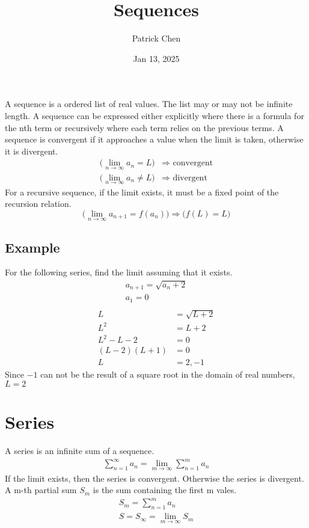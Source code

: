 \documentclass{article}
\title{Sequences}
\author{Patrick Chen}
\date{Jan 13, 2025}
\theoremstyle{mytheoremstyle}
\theoremstyle{mytheoremstyle}
\theoremstyle{myproblemstyle}
\begin{document}
    \maketitle
    A sequence is a ordered list of real values. The list may or may not be
    infinite length. A sequence can be expressed either explicitly where there
    is a formula for the nth term or recursively where each term relies on the
    previous terms. A sequence is convergent if it approaches a value when the
    limit is taken, otherwise it is
    divergent.
    \begin{align*}
        \Big(\lim_{n\rightarrow\infty} a_n = L\Big) &\Rightarrow \text{ convergent} \\
        \Big(\lim_{n\rightarrow\infty} a_n \ne L\Big) &\Rightarrow \text{ divergent}
    \end{align*}
    For a recursive sequence, if the limit exists, it must be a fixed point of
    the recursion relation.
    \[
        \Big(\lim_{n\to \infty} a_{n+1}=f(a_n)\Big) \Rightarrow \Big(f(L)=L\Big)
    \]

    \subsection*{Example}
    For the following series, find the limit assuming that it exists.
    \begin{align*}
        a_{n+1} = \sqrt{a_n + 2} \\
        a_1 = 0 \\
    \end{align*}
    \begin{align*}
        L &= \sqrt{L+2} \\
        L^2 &= L+2 \\
        L^2 - L - 2 &= 0 \\
        (L-2)(L+1) &= 0 \\
        L &= 2, -1
    \end{align*}
    Since $-1$ can not be the result of a square root in the domain of real
    numbers, $L=2$

    \section*{Series}
    A series is an infinite sum of a sequence.
    \begin{align*}
        \sum_{n=1}^{\infty} a_n = \lim_{m\to \infty} \sum_{n=1}^{m} a_n
    \end{align*}
    If the limit exists, then the series is convergent. Otherwise the series is
    divergent. A m-th partial sum $S_m$ is the sum containing the first m
    vales.
    \begin{gather*}
        S_m = \sum_{n=1}^{m} a_n \\
        S = S_\infty = \lim_{m\to \infty} S_m
    \end{gather*}
\end{document}
